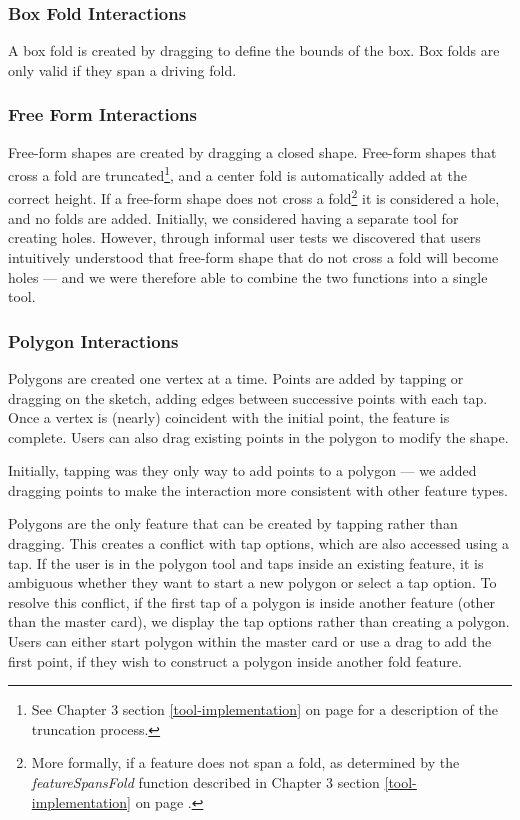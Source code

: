 \subsubsection{Box Fold Interactions}\label{box-fold-interactions}

A box fold is created by dragging to define the bounds of the box. Box
folds are only valid if they span a driving fold.

\subsubsection{Free Form Interactions}\label{free-form-interactions}

Free-form shapes are created by dragging a closed shape. Free-form
shapes that cross a fold are truncated\footnote{See Chapter 3 section
  \ref{tool-implementation} on page \pageref{truncation} for a
  description of the truncation process.}, and a center fold is
automatically added at the correct height. If a free-form shape does not
cross a fold\footnote{More formally, if a feature does not span a fold,
  as determined by the \emph{featureSpansFold} function described in
  Chapter 3 section \ref{tool-implementation} on page
  \pageref{tool-implementation}.} it is considered a hole, and no folds
are added. Initially, we considered having a separate tool for creating
holes. However, through informal user tests we discovered that users
intuitively understood that free-form shape that do not cross a fold
will become holes --- and we were therefore able to combine the two
functions into a single tool.

\subsubsection{Polygon Interactions}\label{polygon-interactions}

Polygons are created one vertex at a time. Points are added by tapping
or dragging on the sketch, adding edges between successive points with
each tap. Once a vertex is (nearly) coincident with the initial point,
the feature is complete. Users can also drag existing points in the
polygon to modify the shape.

Initially, tapping was they only way to add points to a polygon --- we
added dragging points to make the interaction more consistent with other
feature types.

Polygons are the only feature that can be created by tapping rather than
dragging. This creates a conflict with tap options, which are also
accessed using a tap. If the user is in the polygon tool and taps inside
an existing feature, it is ambiguous whether they want to start a new
polygon or select a tap option. To resolve this conflict, if the first
tap of a polygon is inside another feature (other than the master card),
we display the tap options rather than creating a polygon. Users can
either start polygon within the master card or use a drag to add the
first point, if they wish to construct a polygon inside another fold
feature.

